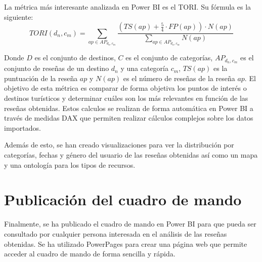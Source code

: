 La métrica más interesante analizada en Power BI es el TORI. Su fórmula es la siguiente:
\begin{equation}
    TORI(d_n, c_m) = \sum_{ap \in AP_{d_n, c_m}} \frac{\left( TS(ap) + \frac{5}{4} \cdot FP(ap) \right) \cdot N(ap)}{\sum_{ap \in AP_{d_n, c_m}} N(ap)}
\end{equation} 

Donde $D$ es el conjunto de destinos, $C$ es el conjunto de categorías, $AP_{d_n,c_m}$ es el conjunto de reseñas de un destino $d_n$ y una categoría $c_m$, $TS(ap)$ es la puntuación de la reseña $ap$ y $N(ap)$ es el número de reseñas de la reseña $ap$.
El objetivo de esta métrica es comparar de forma objetiva los puntos de interés o destinos turísticos y determinar cuáles son los más relevantes en función de las reseñas obtenidas.
Estos calculos se realizan de forma automática en Power BI a través	de medidas DAX que permiten realizar cálculos complejos sobre los datos importados.

Además de esto, se han creado visualizaciones para ver la distribución por categorías, fechas y género del usuario de las reseñas obtenidas así como un mapa y una ontología para los tipos de recursos.

\section{Publicación del cuadro de mando}

Finalmente, se ha publicado el cuadro de mando en Power BI para que pueda ser consultado por cualquier persona interesada en el análisis de las reseñas obtenidas.
Se ha utilizado PowerPages para crear una página web que permite acceder al cuadro de mando de forma sencilla y rápida.